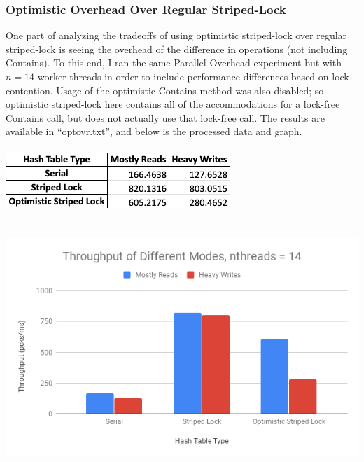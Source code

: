 \documentclass{article}
\begin{document}
\begin{adjustwidth}{-2cm}{-2cm}
\subsubsection{Optimistic Overhead Over Regular Striped-Lock}
One part of analyzing the tradeoffs of using optimistic striped-lock over regular striped-lock is seeing the overhead of the difference in operations (not including Contains). To this end, I ran the same Parallel Overhead experiment but with $n = 14$ worker threads in order to include performance differences based on lock contention. Usage of the optimistic Contains method was also disabled; so optimistic striped-lock here contains all of the accommodations for a lock-free Contains call, but does not actually use that lock-free call. The results are available in ``optovr.txt'', and below is the processed data and graph.\\
\null\\
\includegraphics[width=\linewidth]{oo_data.png}\\ \null\\
\null\\
\includegraphics[width=\linewidth]{oo_graph.png}\\ \null\\

\end{adjustwidth}
\end{document}
